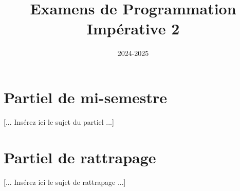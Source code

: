 \documentclass[12pt]{article}
\title{Examens de Programmation Impérative 2}
\date{2024-2025}
\begin{document}
\maketitle

\section*{Partiel de mi-semestre}
[... Insérez ici le sujet du partiel ...]

\section*{Partiel de rattrapage}
[... Insérez ici le sujet de rattrapage ...]
\end{document}
